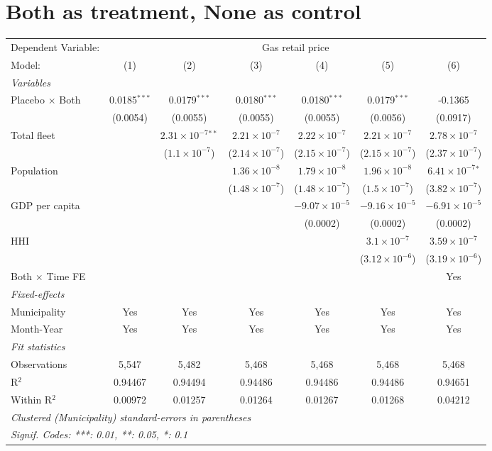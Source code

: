 \documentclass[
]{article}
\begin{document}
\hypertarget{both-as-treatment-none-as-control}{%
\section{Both as treatment, None as
control}\label{both-as-treatment-none-as-control}}

\begin{tabular}{lcccccc}
\tabularnewline\midrule\midrule
Dependent Variable:&\multicolumn{6}{c}{Gas retail price}\\
Model:&(1) & (2) & (3) & (4) & (5) & (6)\\
\midrule \emph{Variables}&   &   &   &   &   &  \\
Placebo $\times $ Both & 0.0185$^{***}$ & 0.0179$^{***}$ & 0.0180$^{***}$ & 0.0180$^{***}$ & 0.0179$^{***}$ & -0.1365\\
  &(0.0054) & (0.0055) & (0.0055) & (0.0055) & (0.0056) & (0.0917)\\
Total fleet &    & $2.31\times 10^{-7}$$^{**}$ & $2.21\times 10^{-7}$ & $2.22\times 10^{-7}$ & $2.21\times 10^{-7}$ & $2.78\times 10^{-7}$\\
  &   & ($1.1\times 10^{-7}$) & ($2.14\times 10^{-7}$) & ($2.15\times 10^{-7}$) & ($2.15\times 10^{-7}$) & ($2.37\times 10^{-7}$)\\
Population &    &    & $1.36\times 10^{-8}$ & $1.79\times 10^{-8}$ & $1.96\times 10^{-8}$ & $6.41\times 10^{-7}$$^{*}$\\
  &   &    & ($1.48\times 10^{-7}$) & ($1.48\times 10^{-7}$) & ($1.5\times 10^{-7}$) & ($3.82\times 10^{-7}$)\\
GDP per capita &    &    &    & $-9.07\times 10^{-5}$ & $-9.16\times 10^{-5}$ & $-6.91\times 10^{-5}$\\
  &   &    &    & (0.0002) & (0.0002) & (0.0002)\\
HHI &    &    &    &    & $3.1\times 10^{-7}$ & $3.59\times 10^{-7}$\\
  &   &    &    &    & ($3.12\times 10^{-6}$) & ($3.19\times 10^{-6}$)\\
Both $\times$ Time FE &  &  &  &  &  & Yes\\
\midrule \emph{Fixed-effects}&   &   &   &   &   &  \\
Municipality & Yes & Yes & Yes & Yes & Yes & Yes\\
Month-Year & Yes & Yes & Yes & Yes & Yes & Yes\\
\midrule \emph{Fit statistics}&  & & & & & \\
Observations & 5,547&5,482&5,468&5,468&5,468&5,468\\
R$^2$ & 0.94467&0.94494&0.94486&0.94486&0.94486&0.94651\\
Within R$^2$ & 0.00972&0.01257&0.01264&0.01267&0.01268&0.04212\\
\midrule\midrule\multicolumn{7}{l}{\emph{Clustered (Municipality) standard-errors in parentheses}}\\
\multicolumn{7}{l}{\emph{Signif. Codes: ***: 0.01, **: 0.05, *: 0.1}}\\
\end{tabular}
\end{document}
